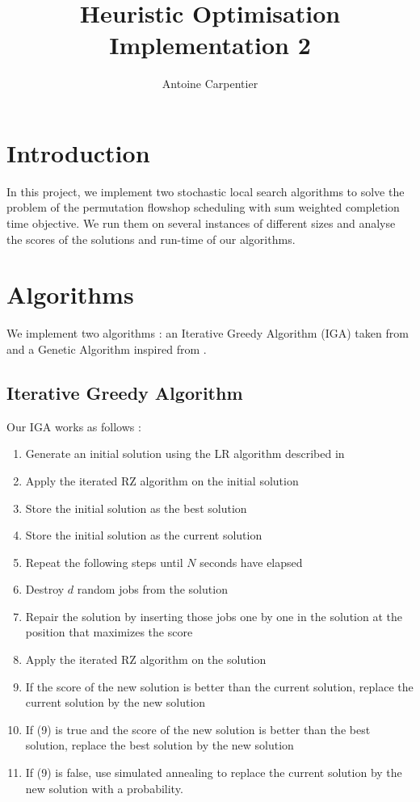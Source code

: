 \documentclass[a4paper,10pt]{article}
\title{Heuristic Optimisation\\Implementation 2}
\author{Antoine Carpentier}
\begin{document}
\maketitle

\section{Introduction}

In this project, we implement two stochastic local search algorithms to solve the problem of the permutation flowshop scheduling with sum weighted completion time objective. We run them on several instances of different sizes and analyse the scores of the solutions and run-time of our algorithms.

\section{Algorithms}

We implement two algorithms : an Iterative Greedy Algorithm (IGA) taken from \cite{panruiz2012} and a Genetic Algorithm inspired from \cite{tseng2010genetic}.

	\subsection{Iterative Greedy Algorithm}

	Our IGA works as follows : 

	\begin{enumerate}
		\item Generate an initial solution using the LR algorithm described in \cite{liu2001constructive}
		\item Apply the iterated RZ algorithm on the initial solution
		\item Store the initial solution as the best solution
		\item Store the initial solution as the current solution
		\item Repeat the following steps until $N$ seconds have elapsed
		\item Destroy $d$ random jobs from the solution
		\item Repair the solution by inserting those jobs one by one in the solution at the position that maximizes the score
		\item Apply the iterated RZ algorithm on the solution
		\item If the score of the new solution is better than the current solution, replace the current solution by the new solution
		\item If (9) is true and the score of the new solution is better than the best solution, replace the best solution by the new solution
		\item If (9) is false, use simulated annealing to replace the current solution by the new solution with a probability.
	\end{enumerate}
\end{document}
